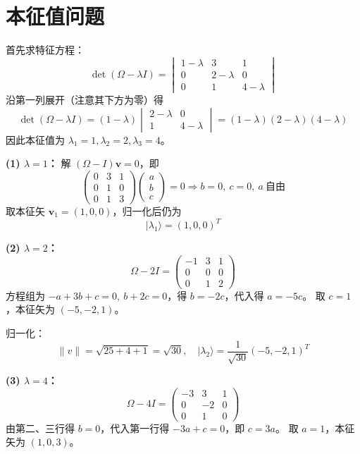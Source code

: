 ﻿%
\section{本征值问题}

\begin{solution}[矩阵本征值与本征矢]
\answer
首先求特征方程：
\[
\det(\Omega-\lambda I)
=\begin{vmatrix}
1-\lambda & 3 & 1\\
0 & 2-\lambda & 0\\
0 & 1 & 4-\lambda
\end{vmatrix}
\]
沿第一列展开（注意其下方为零）得
\[
\det(\Omega-\lambda I)
=(1-\lambda)\begin{vmatrix}
2-\lambda & 0\\
1 & 4-\lambda
\end{vmatrix}
=(1-\lambda)(2-\lambda)(4-\lambda)
\]
因此本征值为 $\lambda_1=1,\lambda_2=2,\lambda_3=4$。

\vspace{0.3em}
\textbf{(1) $\lambda=1$：}
解 $(\Omega-I)\mathbf{v}=0$，即
\[
\begin{pmatrix}
0&3&1\\
0&1&0\\
0&1&3
\end{pmatrix}
\begin{pmatrix}a\\b\\c\end{pmatrix}=0
\Rightarrow b=0,\ c=0,\ a\ \text{自由}
\]
取本征矢 $\mathbf{v}_1=(1,0,0)$，归一化后仍为
\[
|\lambda_1\rangle=(1,0,0)^T
\]

\vspace{0.3em}
\textbf{(2) $\lambda=2$：}
\[
\Omega-2I=
\begin{pmatrix}
-1&3&1\\
0&0&0\\
0&1&2
\end{pmatrix}
\]
方程组为 $-a+3b+c=0,\ b+2c=0$，得 $b=-2c$，代入得 $a=-5c$。
取 $c=1$，本征矢为 $(-5,-2,1)$。

归一化：
\[
\|v\|=\sqrt{25+4+1}=\sqrt{30},\quad
|\lambda_2\rangle=\frac{1}{\sqrt{30}}(-5,-2,1)^T
\]

\vspace{0.3em}
\textbf{(3) $\lambda=4$：}
\[
\Omega-4I=
\begin{pmatrix}
-3&3&1\\
0&-2&0\\
0&1&0
\end{pmatrix}
\]
由第二、三行得 $b=0$，代入第一行得 $-3a+c=0$，即 $c=3a$。
取 $a=1$，本征矢为 $(1,0,3)$。


\end{solution}
